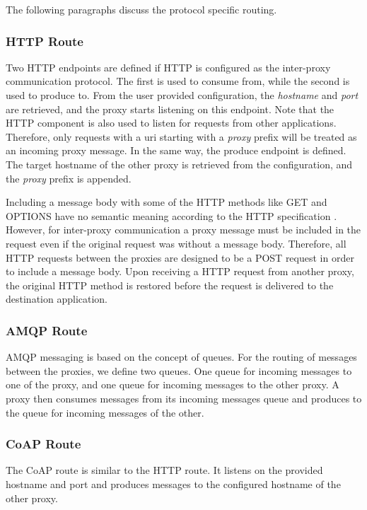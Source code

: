 The following paragraphs discuss the protocol specific routing.

\subsubsection{HTTP Route}

Two HTTP endpoints are defined if HTTP is configured as the inter-proxy
communication protocol. The first is used to consume from, while the second is
used to produce to. From the user provided configuration, the \textit{hostname}
and \textit{port} are retrieved, and the proxy starts listening on this
endpoint. Note that the HTTP component is also used to listen for requests from
other applications. Therefore, only requests with a \gls{uri} starting with a
\textit{proxy} prefix will be treated as an incoming proxy message. In the same
way, the produce endpoint is defined. The target hostname of the other proxy is
retrieved from the configuration, and the \textit{proxy} prefix is appended.

Including a message body with some of the HTTP methods like GET and OPTIONS have
no semantic meaning according to the HTTP specification \cite{rfc-2616}.
However, for inter-proxy communication a proxy message must be included in the
request even if the original request was without a message body. Therefore, all
HTTP requests between the proxies are designed to be a POST request in order to
include a message body. Upon receiving a HTTP request from another proxy, the
original HTTP method is restored before the request is delivered to the
destination application.

\subsubsection{AMQP Route}

AMQP messaging is based on the concept of queues. For the routing of messages
 between the proxies, we define two queues.
 One queue for incoming messages to one of the proxy,
 and one queue for incoming messages to the other proxy.
 A proxy then consumes messages from its incoming messages queue
 and produces to the queue for incoming messages of the other.

\subsubsection{CoAP Route}

The CoAP route is similar to the HTTP route. It listens on the provided hostname
and port and produces messages to the configured hostname of the other proxy.


